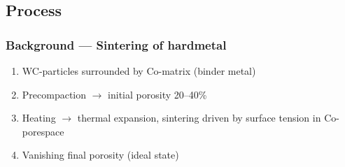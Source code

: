 \documentclass[11pt,mathserif]{beamer}
\begin{document}
\subsection{Process}
\begin{frame}
 \frametitle{Background --- Sintering of hardmetal}


 \begin{enumerate}
  \item WC-particles surrounded by Co-matrix (binder metal)
  \item Precompaction $\rightarrow$ initial porosity 20--40\%
  \item Heating $\rightarrow$ thermal expansion, sintering driven by surface tension in Co-porespace
  \item Vanishing final porosity (ideal state)
  


\end{enumerate}
\end{frame}
\end{document}
